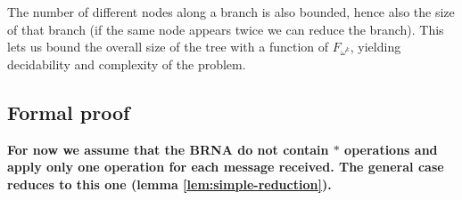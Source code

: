  The number of different nodes along a branch is also bounded, hence also the size of that branch (if the same node appears twice we can reduce the branch).
 This lets us bound the overall size of the tree with a function of $F_{\omega^k}$, yielding decidability and complexity of the problem.

\subsection{Formal proof}
\fi


\textbf{For now we assume that the BRNA do not contain $*$ operations and apply only one operation for each message received. The general case reduces to this one (lemma \ref{lem:simple-reduction}).}

